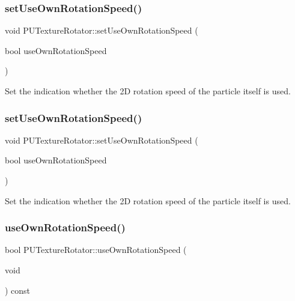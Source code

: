 \subsubsection{\texorpdfstring{set\+Use\+Own\+Rotation\+Speed()}{setUseOwnRotationSpeed()}\hspace{0.1cm}{\footnotesize\ttfamily [1/2]}}
{\footnotesize\ttfamily void P\+U\+Texture\+Rotator\+::set\+Use\+Own\+Rotation\+Speed (\begin{DoxyParamCaption}\item[{bool}]{use\+Own\+Rotation\+Speed }\end{DoxyParamCaption})}

Set the indication whether the 2D rotation speed of the particle itself is used. \mbox{\label{classPUTextureRotator_a997bb8fc630de052732b14fdaa27943f}} 
\subsubsection{\texorpdfstring{set\+Use\+Own\+Rotation\+Speed()}{setUseOwnRotationSpeed()}\hspace{0.1cm}{\footnotesize\ttfamily [2/2]}}
{\footnotesize\ttfamily void P\+U\+Texture\+Rotator\+::set\+Use\+Own\+Rotation\+Speed (\begin{DoxyParamCaption}\item[{bool}]{use\+Own\+Rotation\+Speed }\end{DoxyParamCaption})}

Set the indication whether the 2D rotation speed of the particle itself is used. \mbox{\label{classPUTextureRotator_a6438d215b7fb851bc898a4abc46b32f2}} 
\subsubsection{\texorpdfstring{use\+Own\+Rotation\+Speed()}{useOwnRotationSpeed()}\hspace{0.1cm}{\footnotesize\ttfamily [1/2]}}
{\footnotesize\ttfamily bool P\+U\+Texture\+Rotator\+::use\+Own\+Rotation\+Speed (\begin{DoxyParamCaption}\item[{void}]{ }\end{DoxyParamCaption}) const}

